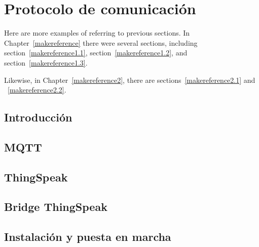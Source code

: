 \cleardoublepage

\chapter{Protocolo de comunicación}
\label{makereference5}

Here are more examples of referring to previous sections.  In
Chapter~\ref{makereference} there were several sections, including
section~\ref{makereference1.1}, section~\ref{makereference1.2},
and section~\ref{makereference1.3}.

Likewise, in Chapter~\ref{makereference2}, there are
sections~\ref{makereference2.1} and ~\ref{makereference2.2}.

\section{Introducción}
\label{makereference5.1}

\section{MQTT}
\label{makereference5.2}

\section{ThingSpeak}
\label{makereference5.3}

\section{Bridge ThingSpeak}
\label{makereference5.4}

\section{Instalación y puesta en marcha}
\label{makereference5.5}